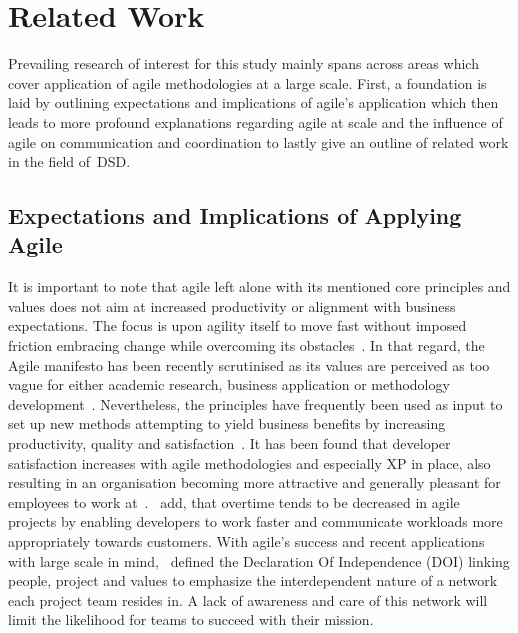 \chapter{Related Work}
\label{chap:related-work}

Prevailing research of interest for this study mainly spans across areas which cover application of agile methodologies at a large scale. First, a foundation is laid by outlining expectations and implications of agile's application which then leads to more profound explanations regarding agile at scale and the influence of agile on communication and coordination to lastly give an outline of related work in the field of~\ac{DSD}.

\section{Expectations and Implications of Applying Agile}

It is important to note that agile left alone with its mentioned core principles and values does not aim at increased productivity or alignment with business expectations. The focus is upon agility itself to move fast without imposed friction embracing change while overcoming its obstacles~\citep{larman2008scalingleanagile}. In that regard, the Agile manifesto has been recently scrutinised as its values are perceived as too vague for either academic research, business application or methodology development~\citep{laanti2013definitionsofagile}.
Nevertheless, the principles have frequently been used as input to set up new methods attempting to yield business benefits by increasing productivity, quality and satisfaction~\citep{leffingwell2007scalelargecorps}. It has been found that developer satisfaction increases with agile methodologies and especially \ac{XP} in place, also resulting in an organisation becoming more attractive and generally pleasant for employees to work at~\citep{eckstein2004xp}.~\citet{mann2005casestudyimpactscrum} add, that overtime tends to be decreased in agile projects by enabling developers to work faster and communicate workloads more appropriately towards customers.
With agile's success and recent applications with large scale in mind,~\citet{cockburn2005doi} defined the Declaration Of Independence (DOI) linking people, project and values to emphasize the interdependent nature of a network each project team resides in. A lack of awareness and care of this network will limit the likelihood for teams to succeed with their mission.

